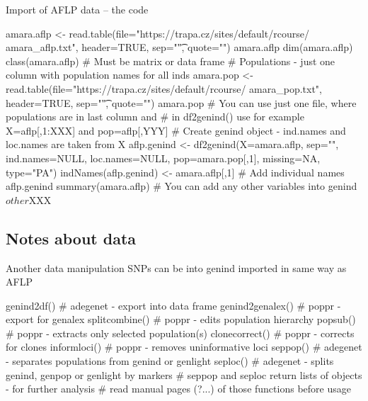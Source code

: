 \documentclass[compress, ucs, xelatex, 11pt, xcolor=svgnames,
  hyperref={
    bookmarks=true,
    unicode=true,
    colorlinks=true,
    pdftitle={Molecular data in R},
    plainpages=false,
    pdfauthor={Vojtech Zeisek},
    pdfsubject={Course about phylogeny and evolution in R},
    pdfcreator={XeLaTeX},
    pdfkeywords={R, evolution, phylogeny, molecular data},
    linkcolor=Tomato,
    anchorcolor=SaddleBrown,
    citecolor=Goldenrod,
    filecolor=DarkMagenta,
    menucolor=Sienna,
    urlcolor=DarkTurquoise,
    pdftex},
  url={hyphens, lowtilde} %
  ]{beamer}
\begin{document}
\begin{frame}[fragile]{Import of AFLP data -- the code}
  \begin{spluscode}
    amara.aflp <- read.table(file="https://trapa.cz/sites/default/rcourse/
      amara_aflp.txt", header=TRUE, sep="\t", quote="")
    amara.aflp
    dim(amara.aflp)
    class(amara.aflp) # Must be matrix or data frame
    # Populations - just one column with population names for all inds
    amara.pop <- read.table(file="https://trapa.cz/sites/default/rcourse/
      amara_pop.txt", header=TRUE, sep="\t", quote="")
    amara.pop
    # You can use just one file, where populations are in last column and
    # in df2genind() use for example X=aflp[,1:XXX] and pop=aflp[,YYY]
    # Create genind object - ind.names and loc.names are taken from X
    aflp.genind <- df2genind(X=amara.aflp, sep="", ind.names=NULL,
      loc.names=NULL, pop=amara.pop[,1], missing=NA, type="PA")
    indNames(aflp.genind) <- amara.aflp[,1] # Add individual names
    aflp.genind
    summary(amara.aflp)
    # You can add any other variables into genind$other$XXX
  \end{spluscode}
\end{frame}

\subsection{Notes about data}

\begin{frame}[fragile]{Another data manipulation}
SNPs can be into genind imported in same way as AFLP
  \begin{spluscode}
    genind2df() # adegenet - export into data frame
    genind2genalex() # poppr - export for genalex
    splitcombine() # poppr - edits population hierarchy
    popsub() # poppr - extracts only selected population(s)
    clonecorrect() # poppr - corrects for clones
    informloci() # poppr - removes uninformative loci
    seppop() # adegenet - separates populations from genind or genlight
    seploc() # adegenet - splits genind, genpop or genlight by markers
    # seppop and seploc return lists of objects - for further analysis
    # read manual pages (?...) of those functions before usage
  \end{spluscode}
\end{frame}
\end{document}
